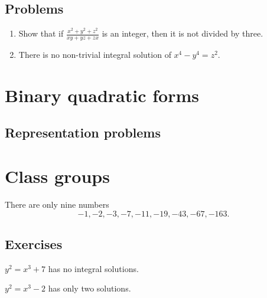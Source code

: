 \documentclass{../note}
\begin{document}
\section*{Problems}

\begin{enumerate}
\item Show that if $\frac{x^2+y^2+z^2}{xy+yz+zx}$ is an integer, then it is not divided by three.
\item There is no non-trivial integral solution of $x^4-y^4=z^2$.
\end{enumerate}




\chapter{Binary quadratic forms}
\section{Representation problems}


\chapter{Class groups}

\begin{prb}
There are only nine numbers
\[-1,-2,-3,-7,-11,-19,-43,-67,-163.\]
\end{prb}

\section*{Exercises}
\begin{prb}
\begin{parts}
\item $y^2=x^3+7$ has no integral solutions.
\end{parts}
\end{prb}

\begin{prb}
\begin{parts}
\item $y^2=x^3-2$ has only two solutions.
\end{parts}
\end{prb}
\end{document}
